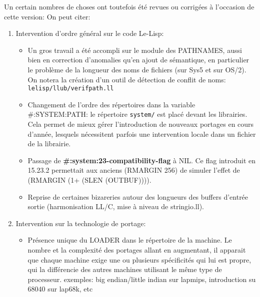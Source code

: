 Un certain nombres de choses ont toutefois
\'{e}t\'{e} revues ou corrig\'{e}es \`{a} l'occasion de cette version:
On peut citer:

\begin {enumerate}

\item Intervention d'ordre g\'{e}n\'{e}ral sur le code Le-Lisp:

\begin {itemize}

\item Un gros travail a \'{e}t\'{e} accompli sur le module des PATHNAMES,
aussi bien en correction d'anomalies qu'en ajout de s\'{e}mantique,
en particulier le probl\`{e}me de la longueur des noms de fichiers (sur
Sys5 et sur OS/2). On notera la cr\'{e}ation d'un outil de
d\'{e}tection de conflit de noms: {\tt lelisp/llub/verifpath.ll}

\item Changement de l'ordre des r\'{e}pertoires dans la variable
\#:SYSTEM:PATH:
le r\'{e}pertoire {\tt system/} est plac\'{e} devant les librairies.
Cela permet de mieux g\'{e}rer l'introduction de nouveaux portages en
cours d'ann\'{e}e, lesquels n\'{e}cessitent parfois une intervention locale dans
un fichier de la librairie.

\item Passage de {\bf \#:system:23-compatibility-flag} \`{a} NIL. Ce flag
introduit en 15.23.2 permettait aux anciens (RMARGIN 256) de simuler
l'effet de (RMARGIN (1+ (SLEN (OUTBUF)))). 

\item Reprise de certaines bizareries autour des longueurs des buffers
d'entr\'{e}e sortie (harmonisation LL/C, mise \`{a} niveau de stringio.ll).

\end {itemize}

\item Intervention sur la technologie de portage:

\begin {itemize}

\item Pr\'{e}sence unique du LOADER dans le r\'{e}pertoire de la machine.
Le nombre et la complexit\'{e} des portages allant en augmentant, il
apparait que chaque machine exige une ou plusieurs sp\'{e}cificit\'{e}s 
qui lui est
propre, qui la diff\'{e}rencie des autres machines utilisant le m\^{e}me
type de processeur.
exemples: big endian/little indian sur lapmips, introduction su 68040
sur lap68k, etc 


\end{itemize}
\end{enumerate}
